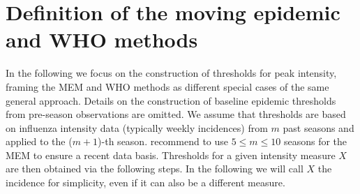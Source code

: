 \documentclass{article}
\begin{document}
\section{Definition of the moving epidemic and WHO methods}
\label{sec:definitions}

In the following we focus on the construction of thresholds  for peak intensity, framing the MEM and WHO methods as different special cases of the same general approach. Details on the construction of baseline epidemic thresholds from pre-season observations are omitted. We assume that thresholds are based on influenza intensity data (typically weekly incidences) from $m$ past seasons and applied to the ($m + 1$)-th season. \cite{Vega2015} recommend to use $5 \leq m \leq 10$ seasons for the MEM to ensure a recent data basis. Thresholds for a given intensity measure $X$ are then obtained via the following steps. In the following we will call $X$ the incidence for simplicity, even if it can also be a different measure.
\end{document}
